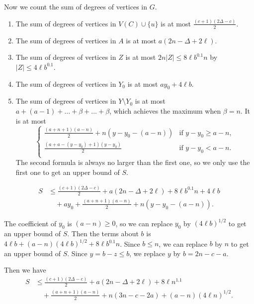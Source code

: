 \documentclass[12pt]{article}%
\begin{document}
Now we count the sum of degrees of vertices in $G$.
\begin{enumerate}
	\item The sum of degrees of vertices in $V(C) \cup \{u\}$ is at most $\frac{(c+1)(2\Delta - c)}{2}$.
	\item The sum of degrees of vertices in $A$ is at most $a(2n-\Delta + 2\ell)$.
	\item The sum of degrees of vertices in $Z$ is at most $2n |Z| \le 8\ell b^{0.1}n$ by $|Z| \le 4\ell b^{0.1}$.
	\item The sum of degrees of vertices in $Y_0$ is at most $ay_0 + 4\ell b$.
	\item The sum of degrees of vertices in $Y \setminus Y_0$ is at most $a + (a-1) + \ldots + \beta + \ldots + \beta$, which achieves the maximum when $\beta = n$.
	It is at most
	\begin{equation*}
		\left\{
	\begin{array}{ll}
		\frac{(a + n+1)(a-n)}{2} + n(y - y_0 - (a-n)) & \text{if } y-y_0 \ge a-n,\\
		\frac{(a + a - (y-y_0)+1)(y-y_0)}{2} & \text{if } y-y_0 < a-n.\\
	\end{array}\right.
	\end{equation*}
	The second formula is always no larger than the first one, so we only use the first one to get an upper bound of $S$.
\end{enumerate}

\begin{equation*}
\begin{aligned}
	S & \le \frac{(c+1)(2\Delta - c)}{2} + a(2n-\Delta + 2\ell) + 8\ell b^{0.1}n + 4 \ell b \\
	& \quad + a y_0 + \frac{(a+n+1)(a-n)}{2} + n (y-y_0-(a-n)).
\end{aligned}
\end{equation*}

The coefficient of $y_0$ is $(a-n) \ge 0$, so we can replace $y_0$ by ${(4\ell b)^{1/2}}$ to get an upper bound of $S$.
Then the terms about $b$ is $4\ell b + (a-n)(4\ell b)^{1/2} + 8\ell b^{0.1}n$.
Since $b \le n$, we can replace $b$ by $n$ to get an upper bound of $S$.
Since $y=b-z\le b$, we replace $y$ by $b = 2n-c-a$.

Then we have
\begin{equation*}
\begin{aligned}
	S & \le \frac{(c+1)(2\Delta - c)}{2} + a(2n-\Delta + 2\ell) + 8\ell n^{1.1}  \\
	& \quad + \frac{(a+n+1)(a-n)}{2} + n (3n-c-2a) + (a-n)(4\ell n)^{1/2}.
\end{aligned}
\end{equation*}
\end{document}
